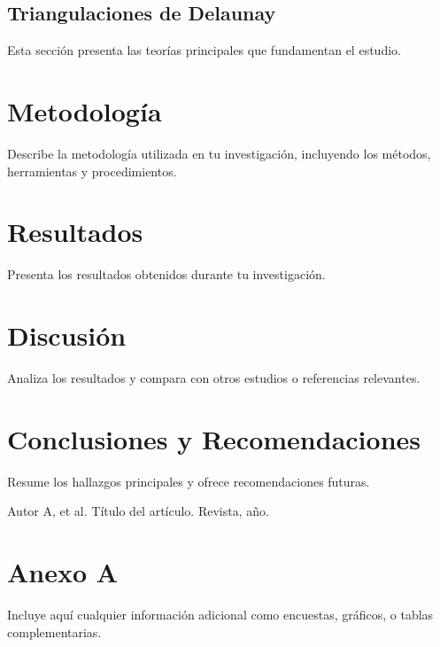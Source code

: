 \documentclass[12pt]{report}
\begin{document}
\section{Triangulaciones de Delaunay}
Esta sección presenta las teorías principales que fundamentan el estudio.
\chapter{Metodología}
Describe la metodología utilizada en tu investigación, incluyendo los métodos, herramientas y procedimientos.

\chapter{Resultados}
Presenta los resultados obtenidos durante tu investigación.

\chapter{Discusión}
Analiza los resultados y compara con otros estudios o referencias relevantes.

\chapter{Conclusiones y Recomendaciones}
Resume los hallazgos principales y ofrece recomendaciones futuras.


\begin{thebibliography}{9}
	 Autor A, et al. Título del artículo. Revista, año.
\end{thebibliography}


\appendix
\chapter{Anexo A}
Incluye aquí cualquier información adicional como encuestas, gráficos, o tablas complementarias.
\end{document}
